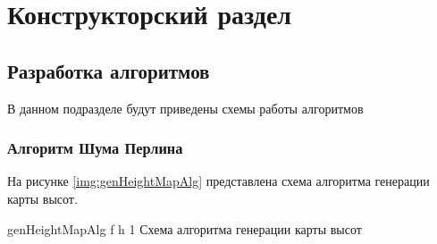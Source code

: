 \chapter{Конструкторский раздел}


%
%

%

\section{Разработка алгоритмов}

В данном подразделе будут приведены схемы работы алгоритмов

\subsection{Алгоритм Шума Перлина}

На рисунке \ref{img:genHeightMapAlg} представлена схема алгоритма генерации карты высот.

{genHeightMapAlg} %
{f} %
{h} %
{1\textwidth} %
{Схема алгоритма генерации карты высот} %

